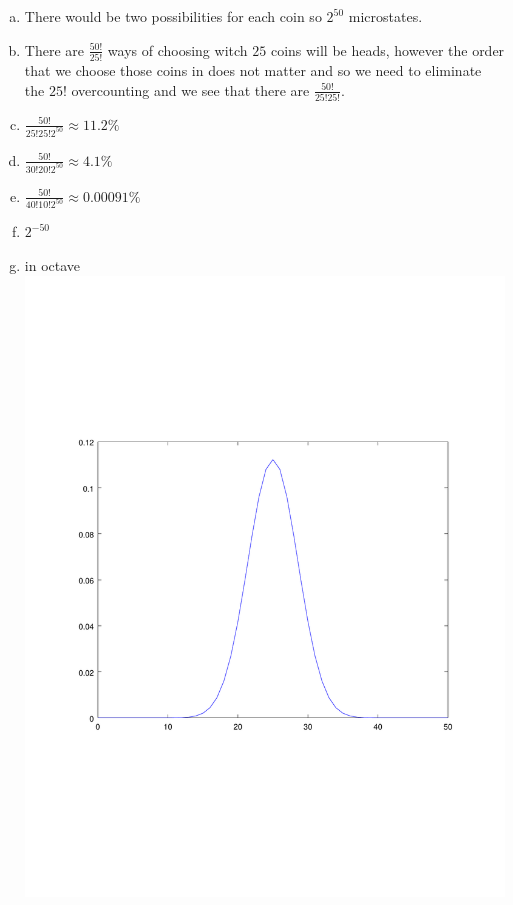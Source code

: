 \documentclass[12pt]{article}
\makeatletter
\theoremstyle{homework}
\newenvironment{exercise}[1]
{\def\@currentlabel{#1}\exercisecore}
{\endexercisecore}
\makeatother
\begin{document}
\begin{exercise}{2.3}
\begin{enumerate}[(a)]
\item
There would be two possibilities for each coin so $2^{50}$ microstates.
\item
There are $\frac{50!}{25!}$ ways of choosing witch $25$ coins will be heads, however the order that we choose those coins in does not matter and so we need to eliminate the $25!$ overcounting and we see that there are $\frac{50!}{25!25!}$.
\item
$\frac{50!}{25!25!2^{50}}\approx 11.2\%$
\item
$\frac{50!}{30!20!2^{50}}\approx 4.1\%$
\item
$\frac{50!}{40!10!2^{50}}\approx 0.00091\%$
\item
$2^{-50}$
\item
in octave\\

\includegraphics[scale=.35]{../octave/f1.pdf}

\end{enumerate}
\end{exercise}
\end{document}
